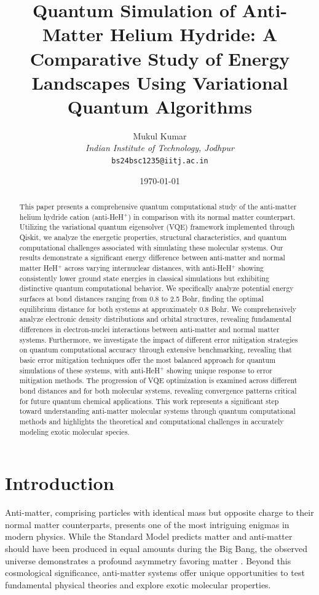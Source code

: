 \documentclass[10pt,twocolumn,a4paper]{article}
\title{\textbf{Quantum Simulation of Anti-Matter Helium Hydride: A Comparative Study of Energy Landscapes Using Variational Quantum Algorithms}}
\author{Mukul Kumar\\
\textit{Indian Institute of Technology, Jodhpur}\\
\texttt{bs24bsc1235@iitj.ac.in}
}
\date{\today}
\begin{document}
\maketitle

\begin{abstract}
This paper presents a comprehensive quantum computational study of the anti-matter helium hydride cation (anti-HeH$^+$) in comparison with its normal matter counterpart. Utilizing the variational quantum eigensolver (VQE) framework implemented through Qiskit, we analyze the energetic properties, structural characteristics, and quantum computational challenges associated with simulating these molecular systems. Our results demonstrate a significant energy difference between anti-matter and normal matter HeH$^+$ across varying internuclear distances, with anti-HeH$^+$ showing consistently lower ground state energies in classical simulations but exhibiting distinctive quantum computational behavior. We specifically analyze potential energy surfaces at bond distances ranging from 0.8 to 2.5 Bohr, finding the optimal equilibrium distance for both systems at approximately 0.8 Bohr. We comprehensively analyze electronic density distributions and orbital structures, revealing fundamental differences in electron-nuclei interactions between anti-matter and normal matter systems. Furthermore, we investigate the impact of different error mitigation strategies on quantum computational accuracy through extensive benchmarking, revealing that basic error mitigation techniques offer the most balanced approach for quantum simulations of these systems, with anti-HeH$^+$ showing unique response to error mitigation methods. The progression of VQE optimization is examined across different bond distances and for both molecular systems, revealing convergence patterns critical for future quantum chemical applications. This work represents a significant step toward understanding anti-matter molecular systems through quantum computational methods and highlights the theoretical and computational challenges in accurately modeling exotic molecular species.
\end{abstract}

\section{Introduction}
Anti-matter, comprising particles with identical mass but opposite charge to their normal matter counterparts, presents one of the most intriguing enigmas in modern physics. While the Standard Model predicts matter and anti-matter should have been produced in equal amounts during the Big Bang, the observed universe demonstrates a profound asymmetry favoring matter \cite{baker2021matter}. Beyond this cosmological significance, anti-matter systems offer unique opportunities to test fundamental physical theories and explore exotic molecular properties.
\end{document}
